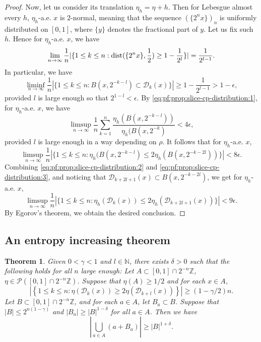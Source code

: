 \documentclass[a4paper,11pt]{amsart}
\newtheorem{theorem}{Theorem}[section]
\theoremstyle{definition}
\numberwithin{equation}{section}
\def\to{\rightarrow}
\def\D{\mathcal{D}}
\def\cP{\mathcal P}
\def\N{\mathbb N}
\def\Z{\mathbb Z}
\DeclareMathOperator{\dist}{{\rm dist}}
\begin{document}
\begin{proof}
Now,  let us consider its translation $\eta_h=\eta+h$.   Then for Lebesgue almost every $h$,  $\eta_h$-a.e.  $x$ is $2$-normal, meaning that the sequence $(\{2^nx\})_{n}$ is uniformly distributed on $[0,1]$, where $\{y\}$ denotes the fractional part of $y$.  Let us fix such $h$.  Hence for $\eta_h$-a.e.  $x$,  we have
\[
\lim_{n\to\infty} \frac{1}{n}|\{ 1\le k\le n: \dist(\{2^n x \}, \frac{1}{2}) \ge 1-\frac{1}{2^l} \}| = \frac{1}{2^{l-1}}. 
\]
In particular, we have
\begin{equation}\label{eq:pf:prop:slice-cp-distribution:2}
\liminf_{n\to\infty}\frac{1}{n}|\{ 1\le k\le n:B(x,2^{-k-l})\subset \D_k(x) \}| \ge 1- \frac{1}{2^{l-1}}>1-\epsilon, 
\end{equation}
provided $l$ is large enough so that  $2^{1-l}<\epsilon$.
By \eqref{eq:pf:prop:slice-cp-distribution:1},  for $\eta_h$-a.e.  $x$, we have
\begin{equation*}
\limsup_{n\to\infty} \frac{1}{n}\sum_{k=1}^n \frac{\eta_h(B(x,2^{-k-l}))}{\eta_h(B(x,2^{-k})}  <4\epsilon,
\end{equation*}
provided $l$ is large enough in a way depending on $\rho$.  It follows that for $\eta_h$-a.e.  $x$, 
\begin{equation}\label{eq:pf:prop:slice-cp-distribution:3}
\limsup_{n\to\infty} \frac{1}{n}|\{ 1\le k\le n: \eta_h(B(x,2^{-k-l}) \le 2 \eta_h(B(x,2^{-k-2l})) \}|<8\epsilon.
\end{equation}
Combining \eqref{eq:pf:prop:slice-cp-distribution:2} and \eqref{eq:pf:prop:slice-cp-distribution:3}, and noticing that $\D_{k+2l+1}(x)\subset B(x,2^{-k-2l})$,  we get  for $\eta_h$-a.e.  $x$, 
\begin{equation*}\label{eq:pf:prop:slice-cp-distribution:4}
\limsup_{n\to\infty} \frac{1}{n}|\{ 1\le k\le n: \eta_h(\D_{k}(x)) \le 2 \eta_h(\D_{k+2l+1}(x)) \}|< 9\epsilon.
\end{equation*}
By Egorov's theorem, we obtain the desired conclusion.
\end{proof}

\subsection{An entropy increasing theorem}\label{subsection: entropy-increasing-theorem:1}

\begin{theorem}\label{thm:entropy-increase-1}
Given $0<\gamma<1$ and $l\in \N$, there exists $\delta>0$ such that the following holds for all $n$ large enough: Let $A\subset [0,1]\cap 2^{-n}\Z$,  $\eta\in \cP([0,1]\cap 2^{-n}\Z)$.  Suppose that $\eta(A)\ge 1/2$ and for each $x\in A$,
\begin{equation}\label{eq:thm:ent-incre:1}
\left| \left\{1\le k\le n: \eta(\D_k(x))\ge 2\eta(\D_{k+l}(x))\right\} \right| \ge (1-\gamma/2)n.
\end{equation}
Let $B\subset [0,1]\cap 2^{-n}\Z$,  and for each $a\in A$,  let $B_a\subset B$.   Suppose that $|B|\le 2^{n(1-\gamma)}$ and $|B_a|\ge |B|^{1-\delta}$ for all $a\in A$. Then we have
\[
\left| \bigcup_{a\in A}(a+B_a) \right| \ge |B|^{1+\delta}.
\]
\end{theorem}
\end{document}
